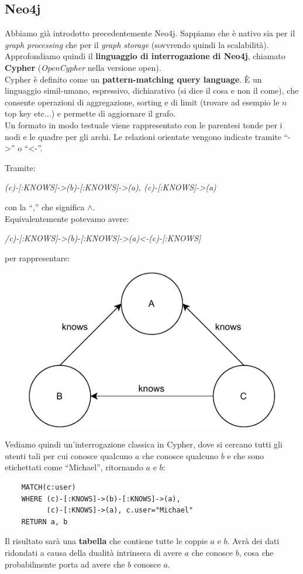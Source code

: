 \documentclass[a4paper,12pt, oneside]{book}
\begin{document}
\subsection{Neo4j}
Abbiamo già introdotto precedentemente Neo4j. Sappiamo che è nativo sia per il
\textit{graph processing} che per il \textit{graph storage} (sovvrendo quindi la
scalabilità).\\
Approfondiamo quindi il \textbf{linguaggio di interrogazione di Neo4j}, chiamato
\textbf{Cypher} (\textit{OpenCypher} nella versione open).\\
Cypher è definito come un \textbf{pattern-matching query language}. È un
linguaggio simil-umano, espressivo, dichiarativo (si dice il cosa e non il
come), che consente operazioni di aggregazione, sorting e di limit (trovare ad
esempio le $n$ top key etc$\ldots$) e permette di aggiornare il grafo.\\
Un formato in modo testuale viene rappresentato con le parentesi tonde per i
nodi e le quadre per gli archi. Le relazioni orientate vengono indicate tramite
``->'' o ``<-''.
\begin{esempio}
  Tramite:
  \begin{center}
    \textit{(c)-[:KNOWS]->(b)-[:KNOWS]->(a), (c)-[:KNOWS]->(a)}
  \end{center}
  con la ``,'' che significa $\land$.\\
  Equivalentemente potevamo avere:
    \begin{center}
    \textit{/c)-[:KNOWS]->(b)-[:KNOWS]->(a)<-(c)-[:KNOWS]}
  \end{center}
  per rappresentare:
  \begin{figure}[H]
    \centering
    \includegraphics[scale = 1]{img/neo.pdf}
  \end{figure}
  Vediamo quindi un'interrogazione classica in Cypher, dove si cercano tutti
  gli utenti tali per cui conosce qualcuno $a$ che conosce qualcuno $b$ e che
  sono etichettati come ``Michael'', ritornando $a$ e $b$: 
  \begin{verbatim}
    MATCH(c:user)
    WHERE (c)-[:KNOWS]->(b)-[:KNOWS]->(a),
          (c)-[:KNOWS]->(a), c.user="Michael"
    RETURN a, b
  \end{verbatim}
  Il risultato sarà una \textbf{tabella} che contiene tutte le coppie $a$ e
  $b$. Avrà dei dati ridondati a causa della dualità intrinseca di avere $a$ che
  conosce $b$, cosa che probabilmente porta ad avere che $b$ conosce $a$.
\end{esempio}
\end{document}
